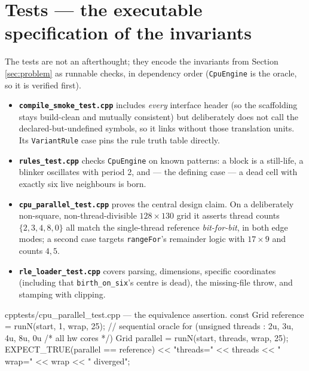\documentclass[
	english,
	letterpaper, oneside
]{article}
\begin{document}
\section{Tests --- the executable specification of the invariants}
\label{sec:tests}

The tests are not an afterthought; they encode the invariants from Section
\ref{sec:problem} as runnable checks, in dependency order
(\texttt{CpuEngine} is the oracle, so it is verified first).

\begin{itemize}
	\item \textbf{\texttt{compile\_smoke\_test.cpp}} includes \emph{every}
	      interface header (so the scaffolding stays build-clean and mutually
	      consistent) but deliberately does not call the declared-but-undefined
	      symbols, so it links without those translation units. Its
	      \texttt{VariantRule} case pins the rule truth table directly.
	\item \textbf{\texttt{rules\_test.cpp}} checks \texttt{CpuEngine} on known
	      patterns: a block is a still-life, a blinker oscillates with period 2,
	      and --- the defining case --- a dead cell with exactly six live
	      neighbours is born.
	\item \textbf{\texttt{cpu\_parallel\_test.cpp}} proves the central design
	      claim. On a deliberately non-square, non-thread-divisible $128\times130$
	      grid it asserts thread counts $\{2,3,4,8,0\}$ all match the single-thread
	      reference \emph{bit-for-bit}, in both edge modes; a second case targets
	      \texttt{rangeFor}'s remainder logic with $17\times9$ and counts $4,5$.
	\item \textbf{\texttt{rle\_loader\_test.cpp}} covers parsing, dimensions,
	      specific coordinates (including that \texttt{birth\_on\_six}'s centre is
	      dead), the missing-file throw, and stamping with clipping.
\end{itemize}

\begin{sourcecode}{cpp}{tests/cpu\_parallel\_test.cpp --- the equivalence assertion.}
const Grid reference = runN(start, 1, wrap, 25);          // sequential oracle
for (unsigned threads : {2u, 3u, 4u, 8u, 0u /* all hw cores */}) {
  Grid parallel = runN(start, threads, wrap, 25);
  EXPECT_TRUE(parallel == reference)
      << "threads=" << threads << " wrap=" << wrap << " diverged";
}
\end{sourcecode}
\end{document}
